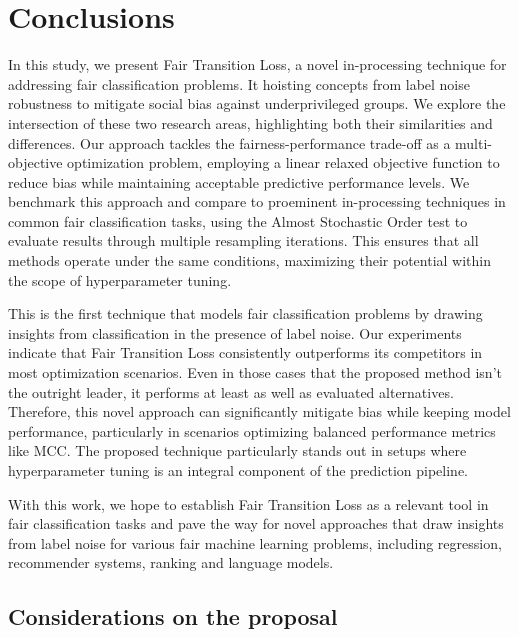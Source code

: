\chapter{Conclusions}\label{chap:conclusions}



In this study, we present Fair Transition Loss, a novel in-processing technique for addressing fair classification problems. It hoisting concepts from label noise robustness to mitigate social bias against underprivileged groups. We explore the intersection of these two research areas, highlighting both their similarities and differences. Our approach tackles the fairness-performance trade-off as a multi-objective optimization problem, employing a linear relaxed objective function to reduce bias while maintaining acceptable predictive performance levels. We benchmark this approach and compare to proeminent in-processing techniques in common fair classification tasks, using the Almost Stochastic Order test to evaluate results through multiple resampling iterations. This ensures that all methods operate under the same conditions, maximizing their potential within the scope of hyperparameter tuning.

This is the first technique that models fair classification problems by drawing insights from classification in the presence of label noise. Our experiments indicate that Fair Transition Loss consistently outperforms its competitors in most optimization scenarios. Even in those cases that the proposed method isn't the outright leader, it performs at least as well as evaluated alternatives. Therefore, this novel approach can significantly mitigate bias while keeping model performance, particularly in scenarios optimizing balanced performance metrics like MCC. The proposed technique particularly stands out in setups where hyperparameter tuning is an integral component of the prediction pipeline.



With this work, we hope to establish Fair Transition Loss as a relevant tool in fair classification tasks and pave the way for novel approaches that draw insights from label noise for various fair machine learning problems, including regression, recommender systems, ranking and language models.

\section{Considerations on the proposal}

